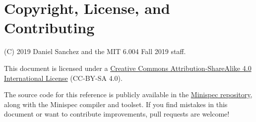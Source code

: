 \section{Copyright, License, and Contributing}

(C) 2019 Daniel Sanchez and the MIT 6.004 Fall 2019 staff.

This document is licensed under a \href{http://creativecommons.org/licenses/by-sa/4.0/}{Creative Commons Attribution-ShareAlike 4.0 International License} (CC-BY-SA 4.0).

The source code for this reference is publicly available in the \href{https://github.mit.edu/6004/minispec/}{Minispec repository},
along with the Minispec compiler and toolset.
If you find mistakes in this document or want to contribute improvements, pull requests are welcome!
